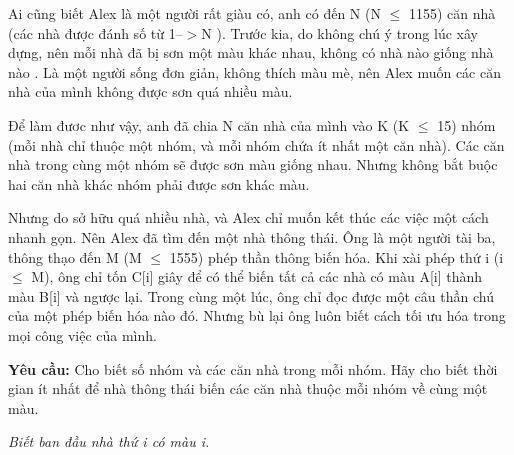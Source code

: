 Ai cũng biết Alex là một người rất giàu có, anh có đến   N (N $\le$ 1155)   căn nhà (các nhà được đánh số từ   1--$>$N   ). Trước kia, do không chú ý trong lúc xây dựng,   nên mỗi nhà đã bị sơn một màu khác nhau,   không có nhà nào giống nhà nào . Là một người sống đơn giản, không thích màu mè, nên Alex muốn các căn nhà của mình không được sơn quá nhiều màu.  

   Để làm đươc như vậy, anh đã chia   N   căn nhà của mình vào   \textbf{}K (K $\le$ 15)   nhóm (mỗi nhà chỉ thuộc một nhóm, và mỗi nhóm chứa ít nhất một căn nhà).   Các căn nhà trong cùng một nhóm sẽ được sơn màu giống nhau.   Nhưng không bắt buộc hai căn nhà khác nhóm phải được sơn khác màu.   \emph{
\\}

   Nhưng do sở hữu quá nhiều nhà, và Alex chỉ muốn kết thúc các việc một cách nhanh gọn. Nên Alex đã tìm đến một nhà thông thái. Ông là một người tài ba, thông thạo đến   M (M $\le$ 1555)   phép thần thông biến hóa. Khi xài phép thứ i (i $\le$ M), ông chỉ tốn C[i] giây để có thể   biến tất cả các nhà có màu A[i] thành màu B[i] và ngược lại.   Trong cùng một lúc, ông chỉ đọc được một câu thần chú của một phép biến hóa nào đó.      Nhưng bù lại ông luôn biết cách tối ưu hóa trong mọi công việc của mình.   \emph{
\\}

\textbf{    Yêu cầu:   }   Cho biết số nhóm và các căn nhà trong mỗi nhóm. Hãy cho biết thời gian ít nhất để nhà thông thái biến các căn nhà thuộc mỗi nhóm về cùng một màu.  

\emph{    Biết ban đầu nhà thứ i có màu i.    
\\}